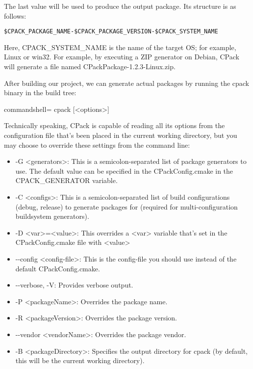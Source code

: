 The last value will be used to produce the output package. Its structure is as follows:

\begin{lstlisting}[style=styleCMake]
$CPACK_PACKAGE_NAME-$CPACK_PACKAGE_VERSION-$CPACK_SYSTEM_NAME
\end{lstlisting}

Here, CPACK\_SYSTEM\_NAME is the name of the target OS; for example, Linux or win32. For example, by executing a ZIP generator on Debian, CPack will generate a file named CPackPackage-1.2.3-Linux.zip.

After building our project, we can generate actual packages by running the cpack binary in the build tree:

\begin{tcblisting}{commandshell={}}
cpack [<options>]
\end{tcblisting}

Technically speaking, CPack is capable of reading all its options from the configuration file that's been placed in the current working directory, but you may choose to override these settings from the command line:

\begin{itemize}
\item 
-G <generators>: This is a semicolon-separated list of package generators to use. The default value can be specified in the CPackConfig.cmake in the CPACK\_GENERATOR variable.

\item 
-C <configs>: This is a semicolon-separated list of build configurations (debug, release) to generate packages for (required for multi-configuration buildsystem generators).

\item 
-D <var>=<value>: This overrides a <var> variable that's set in the CPackConfig.cmake file with <value>

\item 
-{}-config <config-file>: This is the config-file you should use instead of the default CPackConfig.cmake.

\item 
-{}-verbose, -V: Provides verbose output.

\item 
-P <packageName>: Overrides the package name.

\item 
-R <packageVersion>: Overrides the package version.

\item 
-{}-vendor <vendorName>: Overrides the package vendor.

\item 
-B <packageDirectory>: Specifies the output directory for cpack (by default, this will be the current working directory).
\end{itemize}

